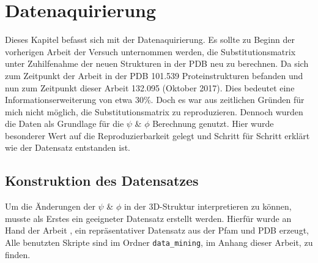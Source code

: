 \chapter[Datenaquirierung]{Datenaquirierung}
\label{chap:Datenaquirierung}

Dieses Kapitel befasst sich mit der Datenaquirierung. Es sollte zu Beginn der vorherigen Arbeit der Versuch unternommen werden, die Substitutionsmatrix unter Zuhilfenahme der neuen Strukturen in der \ac{PDB} neu zu berechnen. Da sich zum Zeitpunkt der Arbeit \cite{Mathias.2014} in der \ac{PDB} 101.539 Proteinstrukturen befanden und nun zum Zeitpunkt dieser Arbeit 132.095 (Oktober 2017). Dies bedeutet eine Informationserweiterung von etwa 30\%. Doch es war aus zeitlichen Gründen für mich nicht möglich, die Substitutionsmatrix zu reproduzieren. Dennoch wurden die Daten als Grundlage für die $\psi$ \& $\phi$ Berechnung genutzt. Hier wurde besonderer Wert auf die Reproduzierbarkeit gelegt und Schritt für Schritt erklärt wie der Datensatz entstanden ist.



\section{Konstruktion des Datensatzes}
\label{sec:konst}

Um die Änderungen der $\psi$ \& $\phi$ in der 3D-Struktur interpretieren zu können, musste als Erstes ein geeigneter Datensatz erstellt werden. Hierfür wurde an Hand der Arbeit \cite{Mathias.2014}, ein repräsentativer Datensatz aus der \ac{Pfam} und \ac{PDB} erzeugt, Alle benutzten Skripte sind im Ordner \texttt{data\_mining}, im Anhang dieser Arbeit, zu finden.


